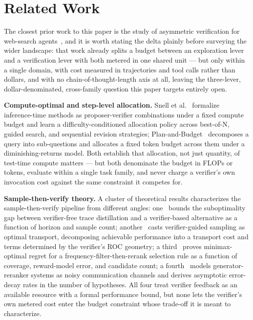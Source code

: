 \documentclass[11pt]{article}
\begin{document}
\section{Related Work}

The closest prior work to this paper is the study of asymmetric verification for web-search agents~\citep{AsymVerifhxL4}, and it is worth stating the delta plainly before surveying the wider landscape: that work already splits a budget between an exploration lever and a verification lever with both metered in one shared unit --- but only within a single domain, with cost measured in trajectories and tool calls rather than dollars, and with no chain-of-thought-length axis at all, leaving the three-lever, dollar-denominated, cross-family question this paper targets entirely open.

\textbf{Compute-optimal and step-level allocation.} Snell et al.~\citep{SnellTTC4FWA} formalize inference-time methods as proposer-verifier combinations under a fixed compute budget and learn a difficulty-conditioned allocation policy across best-of-N, guided search, and sequential revision strategies; Plan-and-Budget~\citep{PlanBudgctsp} decomposes a query into sub-questions and allocates a fixed token budget across them under a diminishing-returns model. Both establish that allocation, not just quantity, of test-time compute matters --- but both denominate the budget in FLOPs or tokens, evaluate within a single task family, and never charge a verifier's own invocation cost against the same constraint it competes for.

\textbf{Sample-then-verify theory.} A cluster of theoretical results characterizes the sample-then-verify pipeline from different angles: one~\citep{VerifierFreeSubbeee} bounds the suboptimality gap between verifier-free trace distillation and a verifier-based alternative as a function of horizon and sample count; another~\citep{OTVerifyBBDh} casts verifier-guided sampling as optimal transport, decomposing achievable performance into a transport cost and terms determined by the verifier's ROC geometry; a third~\citep{BestOfMaja6CV} proves minimax-optimal regret for a frequency-filter-then-rerank selection rule as a function of coverage, reward-model error, and candidate count; a fourth~\citep{RerankLawsrhCg} models generator-reranker systems as noisy communication channels and derives asymptotic error-decay rates in the number of hypotheses. All four treat verifier feedback as an available resource with a formal performance bound, but none lets the verifier's own metered cost enter the budget constraint whose trade-off it is meant to characterize.
\end{document}
